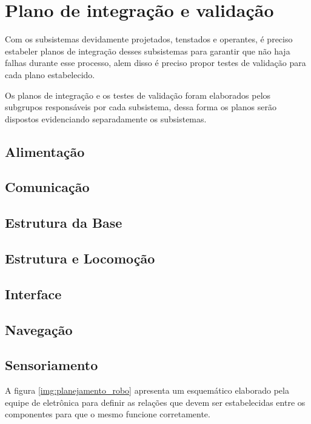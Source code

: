 \section{Plano de integração e validação} %
\label{sec:plano_de_integração_e_validação}
	Com os subsistemas devidamente projetados, tenstados e operantes, é preciso estabeler planos de integração desses subsistemas para garantir que não haja falhas durante esse processo, alem disso é preciso propor testes de validação para cada plano estabelecido.

	Os planos de integração e os testes de validação foram elaborados pelos subgrupos responsáveis por cada subsistema, dessa forma os planos serão dispostos evidenciando separadamente os subsistemas.

	\subsection{Alimentação}
	\label{sub:plano_alimentação}

	\subsection{Comunicação}
	\label{sub:plano_comunicação}

	\subsection{Estrutura da Base}
	\label{sub:plano_estrutura}

	\subsection{Estrutura e Locomoção}
	\label{sub:plano_locomoção}

	\subsection{Interface}
	\label{sub:plano_interface}

	\subsection{Navegação}
	\label{sub:plano_navegação}

	\subsection{Sensoriamento}
	\label{sub:plano_sensoriamento}
		A figura \ref{img:planejamento_robo} apresenta um esquemático elaborado pela equipe de eletrônica para definir as relações que devem ser estabelecidas entre os componentes para que o mesmo funcione corretamente.

